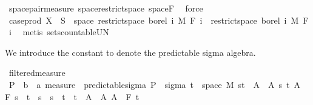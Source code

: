 \begin{isabellebody}
\ space{\isacharunderscore}{\kern0pt}pair{\isacharunderscore}{\kern0pt}measure\ space{\isacharunderscore}{\kern0pt}restrict{\isacharunderscore}{\kern0pt}space\ space{\isacharunderscore}{\kern0pt}F\ \isamarkupfalse%
\ force\ \ \isanewline
\ \ \isamarkupfalse%
\ \isamarkupfalse%
\ {\isachardoublequoteopen}case{\isacharunderscore}{\kern0pt}prod\ X\ {\isacharminus}{\kern0pt}{\isacharbackquote}{\kern0pt}\ S\ {\isasyminter}\ space\ {\isacharparenleft}{\kern0pt}restrict{\isacharunderscore}{\kern0pt}space\ borel\ {\isacharbraceleft}{\kern0pt}{}{\isachardot}{\kern0pt}{\isachardot}{\kern0pt}i{\isacharbraceright}{\kern0pt}\ {\isasymOtimes}\isactrlsub M\ F\ i{\isacharparenright}{\kern0pt}\ {\isasymin}\ restrict{\isacharunderscore}{\kern0pt}space\ borel\ {\isacharbraceleft}{\kern0pt}{}{\isachardot}{\kern0pt}{\isachardot}{\kern0pt}i{\isacharbraceright}{\kern0pt}\ {\isasymOtimes}\isactrlsub M\ F\ i{\isachardoublequoteclose}\ \isamarkupfalse%
\ {\isacharparenleft}{\kern0pt}metis\ sets{\isachardot}{\kern0pt}countable{\isacharunderscore}{\kern0pt}UN{\isacharparenright}{\kern0pt}\isanewline
{}\isamarkupfalse%
%
\endisatagproof
{\isafoldproof}%
%
\isadelimproof
%
\endisadelimproof
%
\isadelimdocument
%
\endisadelimdocument
%
\isatagdocument
%
\isamarkuptrue%
%
\endisatagdocument
{\isafolddocument}%
%
\isadelimdocument
%
\endisadelimdocument
%
\begin{isamarkuptext}%
We introduce the constant  to denote the predictable sigma algebra.%
\end{isamarkuptext}\isamarkuptrue%
\isamarkupfalse%
\ filtered{\isacharunderscore}{\kern0pt}measure\isanewline
{}\isanewline
\isanewline
{}\isamarkupfalse%
\ {\isasymSigma}\isactrlsub P\ {\isacharcolon}{\kern0pt}{\isacharcolon}{\kern0pt}\ {\isachardoublequoteopen}{\isacharparenleft}{\kern0pt}{\isacharprime}{\kern0pt}b\ {\isasymtimes}\ {\isacharprime}{\kern0pt}a{\isacharparenright}{\kern0pt}\ measure{\isachardoublequoteclose}\ \ predictable{\isacharunderscore}{\kern0pt}sigma{\isacharcolon}{\kern0pt}\ {\isachardoublequoteopen}{\isasymSigma}\isactrlsub P\ {\isasymequiv}\ sigma\ {\isacharparenleft}{\kern0pt}{\isacharbraceleft}{\kern0pt}t\ {\isasymtimes}\ space\ M{\isacharparenright}{\kern0pt}\ {\isacharparenleft}{\kern0pt}{\isacharbraceleft}{\kern0pt}{\isacharbraceleft}{\kern0pt}s{\isacharless}{\kern0pt}{\isachardot}{\kern0pt}{\isachardot}{\kern0pt}t{\isacharbraceright}{\kern0pt}\ {\isasymtimes}\ A\ {\isacharbar}{\kern0pt}\ A\ s\ t{\isachardot}{\kern0pt}\ A\ {\isasymin}\ F\ s\ {\isasymand}\ t\ {\isasymle}\ s\ {\isasymand}\ s\ {\isacharless}{\kern0pt}\ t{\isacharbraceright}{\kern0pt}\ {\isasymunion}\ {\isacharbraceleft}{\kern0pt}{\isacharbraceleft}{\kern0pt}t\ {\isasymtimes}\ A\ {\isacharbar}{\kern0pt}\ A{\isachardot}{\kern0pt}\ A\ {\isasymin}\ F\ t\isanewline

\end{isabellebody}
